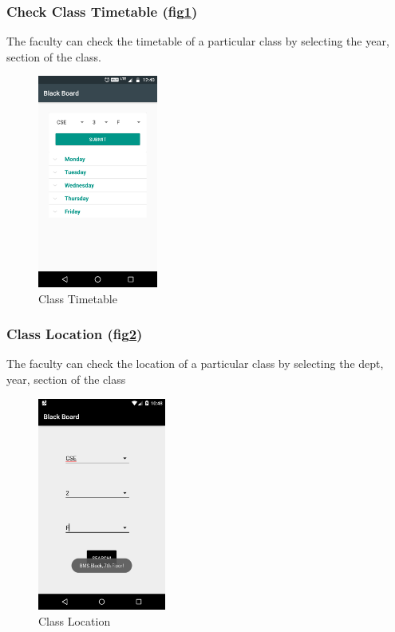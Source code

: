 \documentclass[BTech]{srmuthesis}
\begin{document}
\subsubsection{Check Class Timetable (fig\ref{fig:class-timetable})}
The faculty can check the timetable of a particular class by selecting the year, section of the class.
\begin{figure}[htbp]
	\centering
	\includegraphics[width=\linewidth, height=7cm,keepaspectratio]{classtimetable}
\caption{Class Timetable}
\label{fig:class-timetable}
\end{figure} 
\subsubsection{Class Location (fig\ref{fig:class-location})}
The faculty can check the location of a particular class by selecting the dept, year, section of the class
\begin{figure}[htbp]
	\centering
	\includegraphics[width=\linewidth, height=7cm,keepaspectratio]{classlocation}
\caption{Class Location}
\label{fig:class-location}
\end{figure} 	
\end{document}
